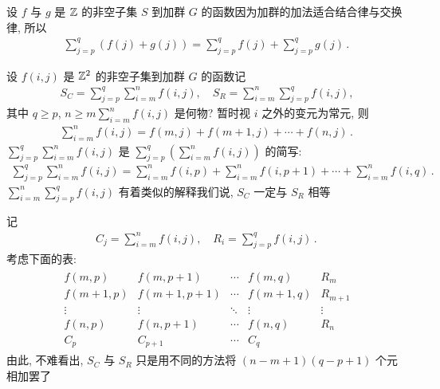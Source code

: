 \begin{example}
    设 $f$ 与 $g$ 是 $\mathbb{Z}$ 的非空子集 $S$ 到加群 $G$ 的函数\period 因为加群的加法适合结合律与交换律, 所以
    \begin{align*}
        \sum_{j=p}^{q} (f(j) + g(j)) = \sum_{j=p}^{q} f(j) + \sum_{j=p}^{q} g(j) \period
    \end{align*}
\end{example}

\begin{remark}
    设 $f(i,j)$ 是 $\mathbb{Z}^2$ 的非空子集到加群 $G$ 的函数\period 记
    \begin{align*}
        S_C = \sum_{j=p}^{q} \sum_{i=m}^{n} f(i,j), \quad S_R = \sum_{i=m}^{n} \sum_{j=p}^{q} f(i,j),
    \end{align*}
    其中 $q \geq p$, $n \geq m$\period $\sum_{i=m}^{n} f(i,j)$ 是何物? 暂时视 $i$ 之外的变元为常元, 则
    \begin{align*}
        \sum_{i=m}^{n} f(i,j) = f(m,j) + f(m+1,j) + \cdots + f(n,j) \period
    \end{align*}
    $\sum_{j=p}^{q} \sum_{i=m}^{n} f(i,j)$ 是 $\sum_{j=p}^{q} \left( \sum_{i=m}^{n} f(i,j) \right)$ 的简写:
    \begin{align*}
        \sum_{j=p}^{q} \sum_{i=m}^{n} f(i,j) = \sum_{i=m}^{n} f(i,p) + \sum_{i=m}^{n} f(i,p+1) + \cdots + \sum_{i=m}^{n} f(i,q) \period
    \end{align*}
    $\sum_{i=m}^{n} \sum_{j=p}^{q} f(i,j)$ 有着类似的解释\period 我们说, $S_C$ 一定与 $S_R$ 相等\period

    记
    \begin{align*}
        C_j = \sum_{i=m}^{n} f(i,j), \quad R_i = \sum_{j=p}^{q} f(i,j) \period
    \end{align*}
    考虑下面的表:
    \begin{align*}
        \begin{array}{cccc|c}
            f(m,p)   & f(m,p+1)   & \cdots & f(m,q)   & R_{m}   \\
            f(m+1,p) & f(m+1,p+1) & \cdots & f(m+1,q) & R_{m+1} \\
            \vdots   & \vdots     & \ddots & \vdots   & \vdots  \\
            f(n,p)   & f(n,p+1)   & \cdots & f(n,q)   & R_{n}   \\ \hline
            C_{p}    & C_{p+1}    & \cdots & C_{q}    & \
        \end{array}
    \end{align*}
    由此, 不难看出, $S_C$ 与 $S_R$ 只是用不同的方法将 $(n-m+1)(q-p+1)$ 个元相加罢了\period
\end{remark}


